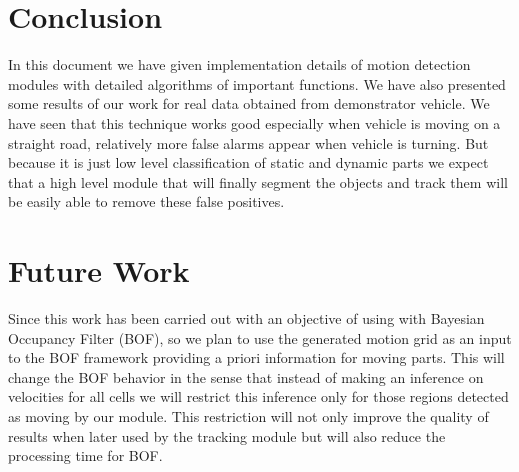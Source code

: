 \section{Conclusion}
In this document we have given implementation details of motion detection modules with detailed algorithms of important functions. We have also presented some results of our work for real data obtained from demonstrator vehicle. We have seen that this technique works good especially when vehicle is moving on a straight road, relatively more false alarms appear when vehicle is turning. But because it is just low level classification of static and dynamic parts we expect that a high level module that will finally segment the objects and track them will be easily able to remove these false positives.

\section{Future Work}
Since this work has been carried out with an objective of using with Bayesian Occupancy Filter (BOF), so we plan to use the generated motion grid as an input to the BOF framework providing a priori information for moving parts. This will change the BOF behavior in the sense that instead of making an inference on velocities for all cells we will restrict this inference only for those regions detected as moving by our module. This restriction will not only improve the quality of results when later used by the tracking module but will also reduce the processing time for BOF.

